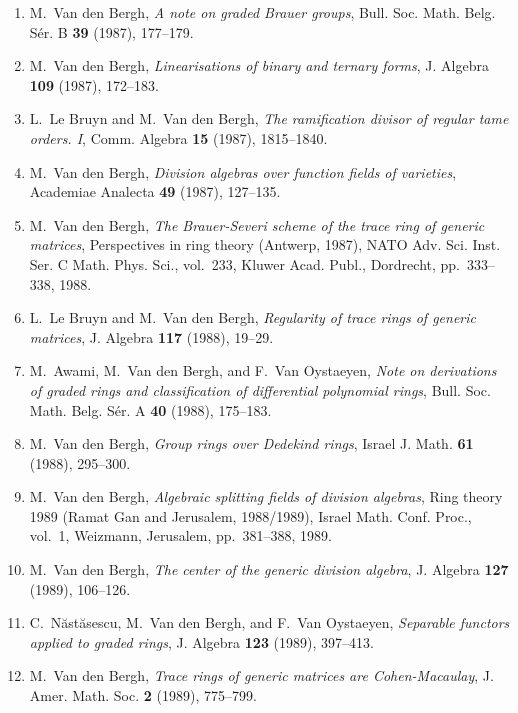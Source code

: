 \begin{enumerate}
\item
M.~Van den Bergh, {\em A note on graded Brauer groups}, Bull. Soc. Math. Belg. S\'er. B {\bf 39} (1987), 177--179.

\item
M.~Van den Bergh, {\em Linearisations of binary and ternary forms}, J. Algebra {\bf 109} (1987), 172--183.

\item
L.~Le Bruyn and M.~Van den Bergh, {\em The ramification divisor of regular tame orders. I}, Comm. Algebra {\bf 15} (1987), 1815--1840.

\item
M.~Van den Bergh, {\em Division algebras over function fields of varieties}, Academiae Analecta {\bf 49} (1987), 127--135.

\item
M.~Van den Bergh, {\em The Brauer-Severi scheme of the trace ring of generic matrices}, Perspectives in ring theory (Antwerp, 1987), NATO Adv. Sci. Inst. Ser. C Math. Phys. Sci., vol.~233, Kluwer Acad. Publ., Dordrecht, pp.~333--338, 1988.

\item
L.~Le Bruyn and M.~Van den Bergh, {\em Regularity of trace rings of generic matrices}, J. Algebra {\bf 117} (1988), 19--29.

\item
M.~Awami, M.~Van den Bergh, and F.~Van Oystaeyen, {\em Note on derivations of graded rings and classification of differential polynomial rings}, Bull. Soc. Math. Belg. S\'er. A {\bf 40} (1988), 175--183.

\item
M.~Van den Bergh, {\em Group rings over Dedekind rings}, Israel J. Math. {\bf 61} (1988), 295--300.

\item
M.~Van den Bergh, {\em Algebraic splitting fields of division algebras}, Ring theory 1989 (Ramat Gan and Jerusalem, 1988/1989), Israel Math. Conf. Proc., vol.~1, Weizmann, Jerusalem, pp.~381--388, 1989.

\item
M.~Van den Bergh, {\em The center of the generic division algebra}, J. Algebra {\bf 127} (1989), 106--126.

\item
C.~N{\u{a}}st{\u{a}}sescu, M.~Van den Bergh, and F.~Van Oystaeyen, {\em Separable functors applied to graded rings}, J. Algebra {\bf 123} (1989), 397--413.

\item
M.~Van den Bergh, {\em Trace rings of generic matrices are Cohen-Macaulay}, J. Amer. Math. Soc. {\bf 2} (1989), 775--799.


\end{enumerate}
